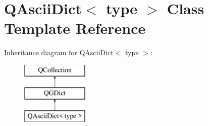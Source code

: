 \hypertarget{class_q_ascii_dict}{}\section{Q\+Ascii\+Dict$<$ type $>$ Class Template Reference}
\label{class_q_ascii_dict}
Inheritance diagram for Q\+Ascii\+Dict$<$ type $>$\+:\begin{figure}[H]
\begin{center}
\leavevmode
\includegraphics[height=3.000000cm]{class_q_ascii_dict}
\end{center}
\end{figure}
